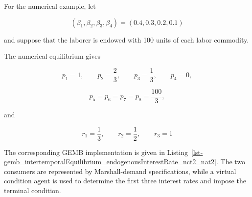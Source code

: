 \documentclass[
  letterpaper,
  DIV=11,
  numbers=noendperiod]{scrreprt}
\begin{document}
For the numerical example, let

\[
(\beta_1,\beta_2,\beta_3,\beta_4)=(0.4,0.3,0.2,0.1)
\]

and suppose that the laborer is endowed with 100 units of each labor
commodity.

The numerical equilibrium gives

\[
p_1=1,\qquad p_2=\frac{2}{3},\qquad p_3=\frac{1}{3},\qquad p_4=0,
\]

\[
p_5=p_6=p_7=p_8=\frac{100}{3},
\]

and

\[
r_1=\frac{1}{3},\qquad r_2=\frac{1}{2},\qquad r_3=1
\]

The corresponding GEMB implementation is given in
Listing~\ref{lst-gemb_intertemporalEquilibrium_endogenousInterestRate_nct2_nat2}.
The two consumers are represented by Marshall-demand specifications,
while a virtual condition agent is used to determine the first three
interest rates and impose the terminal condition.
\end{document}
